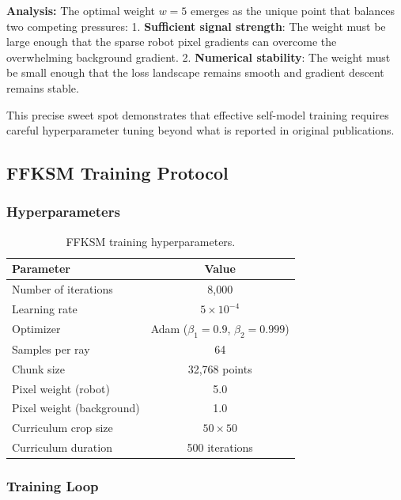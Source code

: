 \documentclass[12pt,a4paper,oneside]{report}
\begin{document}
\textbf{Analysis:} The optimal weight $w = 5$ emerges as the unique point that balances two competing pressures:
1. \textbf{Sufficient signal strength}: The weight must be large enough that the sparse robot pixel gradients can overcome the overwhelming background gradient.
2. \textbf{Numerical stability}: The weight must be small enough that the loss landscape remains smooth and gradient descent remains stable.

This precise sweet spot demonstrates that effective self-model training requires careful hyperparameter tuning beyond what is reported in original publications.

\subsection{FFKSM Training Protocol}

\subsubsection{Hyperparameters}

\begin{table}[H]
\centering
\caption{FFKSM training hyperparameters.}
\label{tab:ffksm_hyperparams}
\begin{tabular}{lc}
\toprule
Parameter & Value \\
\midrule
Number of iterations & 8,000 \\
Learning rate & $5 \times 10^{-4}$ \\
Optimizer & Adam ($\beta_1=0.9$, $\beta_2=0.999$) \\
Samples per ray & 64 \\
Chunk size & 32,768 points \\
Pixel weight (robot) & 5.0 \\
Pixel weight (background) & 1.0 \\
Curriculum crop size & $50 \times 50$ \\
Curriculum duration & 500 iterations \\
\bottomrule
\end{tabular}
\end{table}

\subsubsection{Training Loop}
\end{document}

